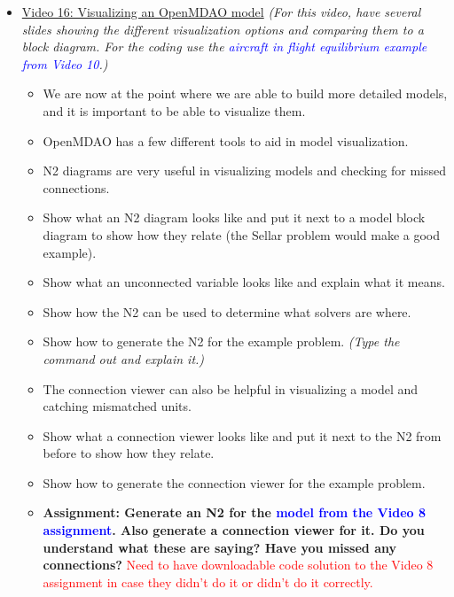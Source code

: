\documentclass[12pt, letterpaper]{article}
\begin{document}
\begin{itemize}
	\item \underline{Video 16: Visualizing an OpenMDAO model} \textit{(For this video, have several slides showing the different visualization options and comparing them to a block diagram. For the coding use the \textcolor{blue}{aircraft in flight equilibrium example from Video 10}.)}
		\begin{itemize}
			\item We are now at the point where we are able to build more detailed models, and it is important to be able to visualize them.
			\item OpenMDAO has a few different tools to aid in model visualization.
			\item N2 diagrams are very useful in visualizing models and checking for missed connections.
			\item Show what an N2 diagram looks like and put it next to a model block diagram to show how they relate (the Sellar problem would make a good example).
			\item Show what an unconnected variable looks like and explain what it means.
			\item Show how the N2 can be used to determine what solvers are where.
			\item Show how to generate the N2 for the example problem. \textit{(Type the command out and explain it.)}
			\item The connection viewer can also be helpful in visualizing a model and catching mismatched units.
			\item Show what a connection viewer looks like and put it next to the N2 from before to show how they relate.
			\item Show how to generate the connection viewer for the example problem.
			\item \textbf{Assignment: Generate an N2 for the \textcolor{blue}{model from the Video 8 assignment}. Also generate a connection viewer for it. Do you understand what these are saying? Have you missed any connections?} \textcolor{red}{Need to have downloadable code solution to the Video 8 assignment in case they didn't do it or didn't do it correctly.}
		\end{itemize}


\end{itemize}
\end{document}
